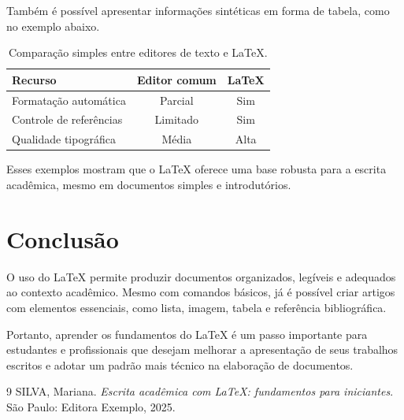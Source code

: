 \documentclass[12pt,a4paper]{article}
\begin{document}
Tamb\'em \'e poss\'ivel apresentar informa\c{c}\~oes sint\'eticas em forma de tabela, como no exemplo abaixo.

\begin{table}[H]
    \centering
    \caption{Compara\c{c}\~ao simples entre editores de texto e LaTeX.}
    \begin{tabular}{|l|c|c|}
        \hline
        Recurso & Editor comum & LaTeX \\
        \hline
        Formata\c{c}\~ao autom\'atica & Parcial & Sim \\
        \hline
        Controle de refer\^encias & Limitado & Sim \\
        \hline
        Qualidade tipogr\'afica & M\'edia & Alta \\
        \hline
    \end{tabular}
\end{table}

Esses exemplos mostram que o LaTeX oferece uma base robusta para a escrita acad\^emica, mesmo em documentos simples e introdut\'orios.

\section{Conclus\~ao}
O uso do LaTeX permite produzir documentos organizados, leg\'iveis e adequados ao contexto acad\^emico. Mesmo com comandos b\'asicos, j\'a \'e poss\'ivel criar artigos com elementos essenciais, como lista, imagem, tabela e refer\^encia bibliogr\'afica.

Portanto, aprender os fundamentos do LaTeX \'e um passo importante para estudantes e profissionais que desejam melhorar a apresenta\c{c}\~ao de seus trabalhos escritos e adotar um padr\~ao mais t\'ecnico na elabora\c{c}\~ao de documentos.

\begin{thebibliography}{9}
SILVA, Mariana.
\textit{Escrita acad\^emica com LaTeX: fundamentos para iniciantes}.
S\~ao Paulo: Editora Exemplo, 2025.
\end{thebibliography}
\end{document}
